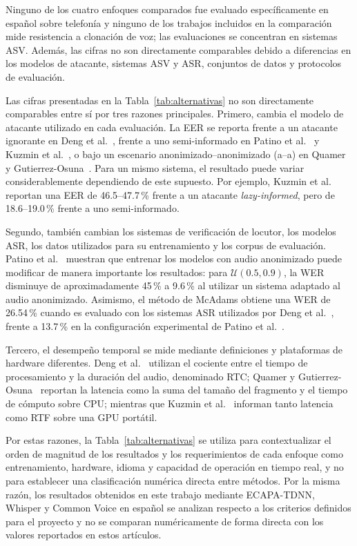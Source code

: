 \documentclass[10pt,twocolumn]{article}
\begin{document}
Ninguno de los cuatro enfoques comparados fue evaluado específicamente en
español sobre telefonía y ninguno de los trabajos incluidos en la comparación
mide resistencia a clonación de voz; las evaluaciones se concentran en sistemas
ASV. Además, las cifras no son directamente comparables debido a diferencias
en los modelos de atacante, sistemas ASV y ASR, conjuntos de datos y protocolos
de evaluación.

Las cifras presentadas en la Tabla~\ref{tab:alternativas} no son directamente comparables 
entre sí por tres razones principales. Primero, cambia el modelo de atacante utilizado 
en cada evaluación. La EER se reporta frente a un atacante ignorante en Deng et al.~\cite{deng2023}, 
frente a uno semi-informado en Patino et al.~\cite{patino2021} y Kuzmin et al.~\cite{kuzmin2026}, 
o bajo un escenario anonimizado--anonimizado (a--a) en Quamer y Gutierrez-Osuna~\cite{quamer2024}. 
Para un mismo sistema, el resultado puede variar considerablemente dependiendo de este supuesto. 
Por ejemplo, Kuzmin et al.~\cite{kuzmin2026} reportan una EER de 46.5--47.7\,\% frente a un atacante 
\textit{lazy-informed}, pero de 18.6--19.0\,\% frente a uno semi-informado.

Segundo, también cambian los sistemas de verificación de locutor, los modelos ASR, los datos utilizados 
para su entrenamiento y los corpus de evaluación. Patino et al.~\cite{patino2021} muestran que entrenar 
los modelos con audio anonimizado puede modificar de manera importante los resultados: para 
$\mathcal{U}(0.5,0.9)$, la WER disminuye de aproximadamente 45\,\% a 9.6\,\% al utilizar un sistema 
adaptado al audio anonimizado. Asimismo, el método de McAdams obtiene una WER de 26.54\,\% cuando 
es evaluado con los sistemas ASR utilizados por Deng et al.~\cite{deng2023}, frente a 13.7\,\% en la 
configuración experimental de Patino et al.~\cite{patino2021}.

Tercero, el desempeño temporal se mide mediante definiciones y plataformas de hardware diferentes. 
Deng et al.~\cite{deng2023} utilizan el cociente entre el tiempo de procesamiento y la duración del 
audio, denominado RTC; Quamer y Gutierrez-Osuna~\cite{quamer2024} reportan la latencia como la suma 
del tamaño del fragmento y el tiempo de cómputo sobre CPU; mientras que Kuzmin et al.~\cite{kuzmin2026} 
informan tanto latencia como RTF sobre una GPU portátil.

Por estas razones, la Tabla~\ref{tab:alternativas} se utiliza para contextualizar el orden de magnitud 
de los resultados y los requerimientos de cada enfoque como entrenamiento, hardware, idioma y capacidad 
de operación en tiempo real, y no para establecer una clasificación numérica directa entre métodos. Por 
la misma razón, los resultados obtenidos en este trabajo mediante ECAPA-TDNN, Whisper y Common Voice en 
español se analizan respecto a los criterios definidos para el proyecto y no se comparan numéricamente 
de forma directa con los valores reportados en estos artículos.
\end{document}

